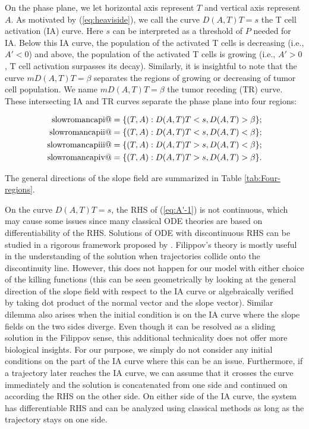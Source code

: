 \documentclass[review,authoryear]{elsarticle}
\makeatletter
\newcommand*{\rom}[1]{\expandafter\@slowromancap\romannumeral #1@}
\makeatother
\begin{document}
On the phase plane, we let horizontal axis
represent $T$ and vertical axis represent $A$. As motivated by (\ref{eq:heaviside}), we call the curve
$D(A,T)T=s$ the T cell activation (IA) curve. Here $s$ can be interpreted as a threshold of $P$ needed for IA. Below this IA curve, the population
of the activated T cells is decreasing (i.e., $A'<0$) and above, the population
of the activated T cells is growing (i.e., $A'>0$, T cell activation surpasses its decay).
Similarly, it is insightful to note that the curve $mD(A,T)T=\beta$
separates the regions of growing or decreasing of tumor cell population. We name
$mD(A,T)T=\beta$ the tumor receding (TR) curve. These intersecting IA and TR curves separate
the phase plane into four regions: 
\begin{linenomath*}
\begin{align*} 
\text{\rom{1}} &=  \{(T,A): D(A,T)T<s, D(A,T)>\beta \}; \\ 
\text{\rom{2}} &=  \{(T,A): D(A,T)T<s, D(A,T)<\beta \}; \\ 
\text{\rom{3}} &=  \{(T,A): D(A,T)T>s, D(A,T)<\beta \}; \\ 
\text{\rom{4}} &=  \{(T,A): D(A,T)T>s, D(A,T)>\beta \}. 
\end{align*}
\end{linenomath*}
The general directions of the slope field are summarized in Table \ref{tab:Four-regions}. 

On the curve $D(A,T)T=s$, the RHS of (\ref{eq:A'-1})
is not continuous, which may cause some issues since many classical
ODE theories are based on differentiability of the RHS. Solutions of ODE
with discontinuous RHS can be studied in a rigorous framework proposed
by \citet{Filippov1988}. Filippov's theory is mostly useful
in the understanding of the solution when trajectories collide onto the
discontinuity line. However, this does not happen for our model with
either choice of the killing functions (this can be seen geometrically by looking
at the general direction of the slope field with respect to the IA
curve or algebraically verified by taking dot product of the normal
vector and the slope vector). Similar dilemma also arises when the
initial condition is on the IA curve where the slope fields on the
two sides diverge. Even though it can be resolved as a sliding solution
in the Filippov sense, this additional technicality does not offer more
biological insights. For our
purpose, we simply do not consider any initial conditions on the part of the IA
curve where this can be an issue. Furthermore, if a trajectory later reaches the IA curve, we
can assume that it crosses the curve immediately and the solution
is concatenated from one side and continued on according the RHS on
the other side. On either side of the IA curve, the system has differentiable RHS and
can be analyzed using classical methods as long as the trajectory
stays on one side. 
\end{document}
